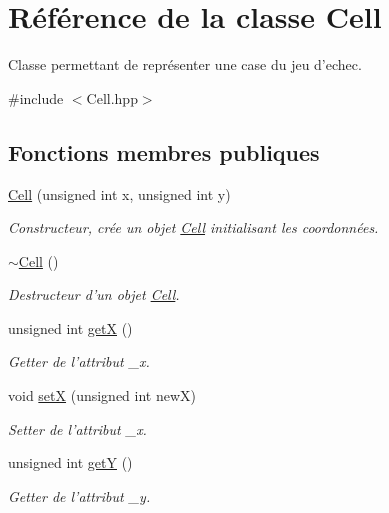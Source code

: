 \hypertarget{class_cell}{\section{Référence de la classe Cell}
\label{class_cell}
}


Classe permettant de représenter une case du jeu d'echec.  




{\ttfamily \#include $<$Cell.\-hpp$>$}

\subsection*{Fonctions membres publiques}
\begin{DoxyCompactItemize}
\item 
\hyperlink{class_cell_a4ccfb0a9923271daba6000afa1a33ee9}{Cell} (unsigned int x, unsigned int y)
\begin{DoxyCompactList}\small\item\em Constructeur, crée un objet \hyperlink{class_cell}{Cell} initialisant les coordonnées. \end{DoxyCompactList}\item 
\hyperlink{class_cell_a9fa559f7a28e2b4336c6879ca09304d8}{$\sim$\-Cell} ()
\begin{DoxyCompactList}\small\item\em Destructeur d'un objet \hyperlink{class_cell}{Cell}. \end{DoxyCompactList}\item 
unsigned int \hyperlink{class_cell_a09a86af000a7b6b00be01c0ea71e5319}{get\-X} ()
\begin{DoxyCompactList}\small\item\em Getter de l'attribut \-\_\-x. \end{DoxyCompactList}\item 
void \hyperlink{class_cell_a5db21f79684f86d4dad8e17a40bbb797}{set\-X} (unsigned int new\-X)
\begin{DoxyCompactList}\small\item\em Setter de l'attribut \-\_\-x. \end{DoxyCompactList}\item 
unsigned int \hyperlink{class_cell_a54bd0f63ff375abde26902cc2ca7ea78}{get\-Y} ()
\begin{DoxyCompactList}\small\item\em Getter de l'attribut \-\_\-y. \end{DoxyCompactList}\item 

\end{DoxyCompactItemize}
